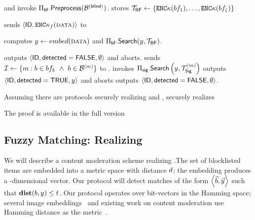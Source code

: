 \begin{algorithm}[t]
\begin{algorithmic}[1]
\State \client and \server invoke $\bfACB.\preprocess(\blindedBlocklist)$. \client stores $\bfBlklistToken \assign \{\encrypt{\genericSymmKey}(\bloomFilter[1]), \dots, \encrypt{\genericSymmKey}(\bloomFilter[\numBins])\}$ 


\Statex{}

\State \client sends $\langle \genericFileID, \encrypt{\fileKey}(\clientData) \rangle$ to \server

\State \client computes $\genericCInputElmt \assign \contentHash(\clientData)$ and $\bfACB.\searchBlocklist(\genericCInputElmt, \bfBlklistToken)$. 

 
\State \server outputs $\langle \mathsf{ID}, \mathsf{detected} = \mathsf{FALSE}, \emptyset \rangle$ and aborts. 
\Else  {}
\State \server sends $\partitionIDSet \assign \{ \partitionIdx: \genericBlocklistElmt \in \bloomFilter[\bloomFilterIdx] ~\land ~\genericBlocklistElmt \in \blocklistPartition{\partitionIdx}\}$ to \client.  
\State \client invokes $\sigACB.\searchBlocklist\left(\genericCInputElmt,\sigBlklistToken{\partitionIdx}\right)$
\State \server outputs $\langle \genericFileID, \detected = \tru, \genericCInputElmt \rangle$ and aborts
\Else
\State \server outputs $\langle \mathsf{ID}, \mathsf{detected} = \mathsf{FALSE}, \emptyset \rangle$. 
\EndIf
\EndFor
\EndIf


\end{algorithmic}
\end{algorithm}

\begin{theorem}
Assuming there are protocols securely realizing \distSigningFunc and \authOPRFFunc, \protocolEM securely realizes \contentModFuncExact 
\end{theorem}

The proof is available in the full version~\cite{code}


\subsection{Fuzzy Matching: Realizing \contentModFuncFuzzy}
%
We will describe a content moderation scheme realizing \contentModFuncFuzzy.The set of blocklisted items are embedded into a metric space with distance $\distance$; the embedding produces a \genericVecLen-dimensional vector. Our protocol will detect matches of the form $\tupleDefn{\blocklistVec, \clientVec}$ such that 
$\distanceNotation[\distance][\genericBlocklistElmt][\genericCInputElmt] \le \threshold$. Our protocol operates over bit-vectors in the Hamming space;  several image embeddings~\cite{singh2025perceptual,neuralHashAttack,yang2025certphash} and existing work on content moderation use Hamming distance as the metric~\cite{kulshrestha2021identifying}.


